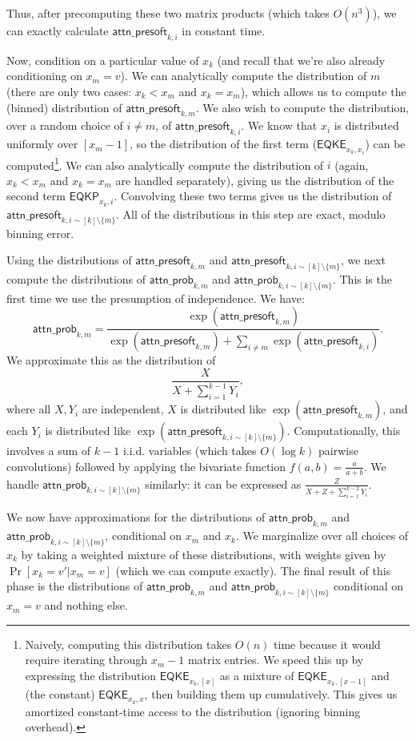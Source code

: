 \documentclass[12pt]{article}
\newcommand{\aps}{\mathsf{attn\_presoft}}
\newcommand{\ap}{\mathsf{attn\_prob}}
\begin{document}
Thus, after precomputing these two matrix products (which takes $O(n^3)$), we can exactly calculate $\aps_{k,i}$ in constant time.

Now, condition on a particular value of $x_k$ (and recall that we're also already conditioning on $x_m = v$). We can analytically compute the distribution of $m$ (there are only two cases: $x_k < x_m$ and $x_k = x_m$), which allows us to compute the (binned) distribution of $\aps_{k,m}$.  We also wish to compute the distribution, over a random choice of $i \neq m$, of $\aps_{k,i}$. We know that $x_i$ is distributed uniformly over $[x_m-1]$, so the distribution of the first term ($\mathsf{EQKE}_{x_k, x_i}$) can be computed\footnote{Naively, computing this distribution takes $O(n)$ time because it would require iterating through $x_m-1$ matrix entries. We speed this up by expressing the distribution $\mathsf{EQKE}_{x_k, [x]}$ as a mixture of $\mathsf{EQKE}_{x_k, [x-1]}$ and (the constant) $\mathsf{EQKE}_{x_k, x}$, then building them up cumulatively. This gives us amortized constant-time access to the distribution (ignoring binning overhead).}. We can also analytically compute the distribution of $i$ (again, $x_k<x_m$ and $x_k=x_m$ are handled separately), giving us the distribution of the second term $\mathsf{EQKP}_{x_k,i}$. Convolving these two terms gives us the distribution of $\aps_{k,i\sim[k]\setminus\{m\}}$. All of the distributions in this step are exact, modulo binning error.

Using the distributions of $\aps_{k, m}$ and $\aps_{k, i\sim[k]\setminus\{m\}}$, we next compute the distributions of $\ap_{k, m}$ and $\ap_{k, i\sim[k]\setminus \{m\}}$. This is the first time we use the presumption of independence. We have:
$$\ap_{k, m} = \frac{\exp(\aps_{k,m})}{\exp(\aps_{k,m}) + \sum_{i \neq m} \exp(\aps_{k,i})}.$$
We approximate this as the distribution of
$$\frac{X}{X + \sum_{i=1}^{k-1} Y_i},$$
where all $X, Y_i$ are independent, $X$ is distributed like $\exp(\aps_{k,m})$, and each $Y_i$ is distributed like $\exp(\aps_{k, i\sim[k]\setminus\{m\}})$. Computationally, this involves a sum of $k-1$ i.i.d. variables (which takes $O(\log k)$ pairwise convolutions) followed by applying the bivariate function $f(a, b) = \frac{a}{a+b}$. We handle $\ap_{k, i\sim[k]\setminus \{m\}}$ similarly: it can be expressed as $\frac{Z}{X + Z + \sum_{i=1}^{k-2} Y_i}$.

We now have approximations for the distributions of $\ap_{k, m}$ and $\ap_{k, i\sim[k]\setminus \{m\}}$, conditional on $x_m$ and $x_k$. We marginalize over all choices of $x_k$ by taking a weighted mixture of these distributions, with weights given by $\Pr[x_k = v' | x_m = v]$ (which we can compute exactly). The final result of this phase is the distributions of $\ap_{k, m}$ and $\ap_{k, i\sim[k]\setminus \{m\}}$ conditional on $x_m = v$ and nothing else.
\end{document}

